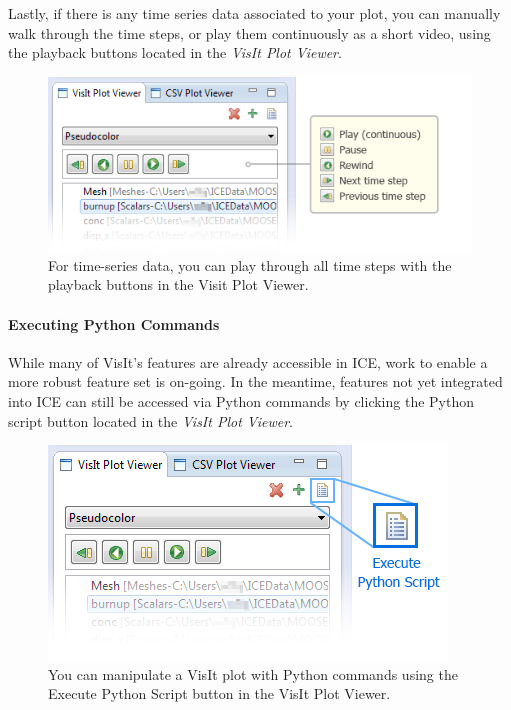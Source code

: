 Lastly, if there is any time series data associated to your plot, you
can manually walk through the time steps, or play them continuously as a
short video, using the playback buttons located in the \emph{VisIt Plot
Viewer}.

\begin{figure}[htbp]
\centering
\includegraphics[scale=.6]{figures/ICE_VisItPlaybackButtons.png}
\caption{For time-series data, you can play through all time steps with the playback buttons in the Visit Plot Viewer. }
\end{figure}

\paragraph{Executing Python Commands}\label{executing-python-commands}

While many of VisIt's features are already accessible in ICE, work to
enable a more robust feature set is on-going. In the meantime, features
not yet integrated into ICE can still be accessed via Python commands by
clicking the Python script button located in the \emph{VisIt Plot
Viewer}.

\begin{figure}[htbp]
\centering
\includegraphics[scale=.6]{figures/ICE_VisItPythonScriptButton.png}
\caption{You can manipulate a VisIt plot with Python commands using the Execute Python Script button in the VisIt Plot Viewer.}
\end{figure}

